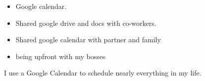 \documentclass[doc,12pt]{apa6}
\begin{document}
\begin{itemize}
\itemsep1pt\parskip0pt
\item
  Google calendar.
\item
  Shared google drive and docs with co-workers.
\item
  Shared google calendar with partner and family
\item
  being upfront with my bosses
\end{itemize}

I use a Google Calendar to schedule nearly everything in my life.

\clearpage



\end{document}
